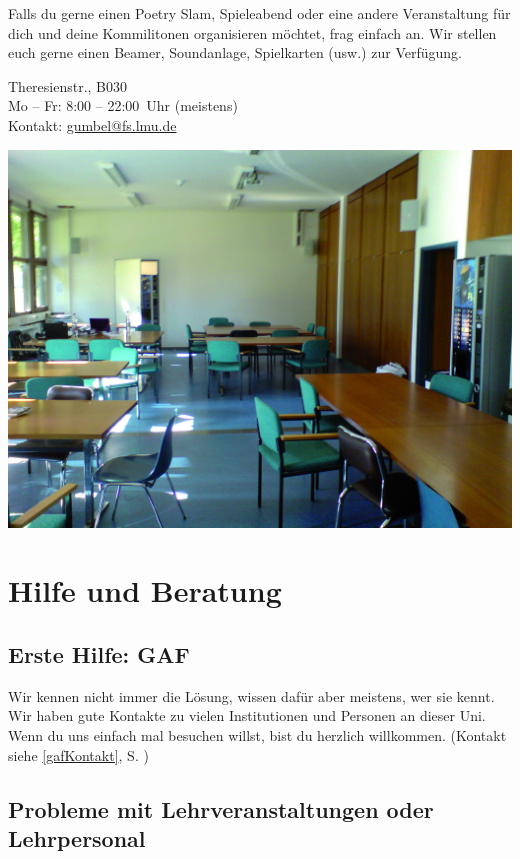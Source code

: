 \documentclass[twoside,12pt,parskip=half-]{scrartcl}
\newcommand{\skiptobottom}{\vspace*{0pt plus 1filll}}
\begin{document}
Falls du gerne einen Poetry Slam, Spieleabend oder
eine andere Veranstaltung für dich und deine Kommilitonen organisieren
möchtet, frag einfach an.  Wir stellen euch gerne einen Beamer, Soundanlage,
Spielkarten (usw.) zur Verfügung.

Theresienstr., B030\\
Mo -- Fr: 8:00 -- 22:00~Uhr (meistens)\\
Kontakt: \url{gumbel@fs.lmu.de}

\skiptobottom
\includegraphics[width=\textwidth]{gumbel_raum_print}

\clearpage


\section{Hilfe und Beratung}

\subsection{Erste Hilfe: GAF}

Wir kennen nicht immer die Lösung, wissen dafür aber meistens, wer sie
kennt. Wir haben gute Kontakte zu vielen Institutionen und Personen an
dieser Uni. Wenn du uns einfach mal besuchen willst, bist du herzlich
willkommen. (Kontakt siehe \ref{gafKontakt}, S. \pageref{gafKontakt})

\subsection{Probleme mit Lehrveranstaltungen oder Lehrpersonal}
\end{document}

